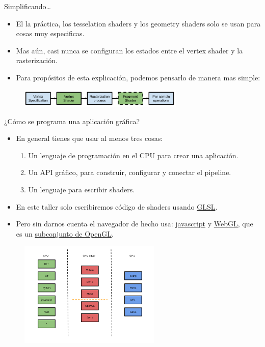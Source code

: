 \begin{frame}{Simplificando\ldots}
\begin{itemize}
    \item El la práctica, los tesselation shaders y los geometry shaders solo se usan para cosas muy especificas.
    \item Mas aún, casi nunca se configuran los estados entre el vertex shader y la rasterización.
    \item Para propósitos de esta explicación, podemos pensarlo de manera mas simple:    
\end{itemize}
\begin{figure}[htb]
  \centering
  \includegraphics[width=0.7\textwidth]{img/SimplifiedPipeline}
\end{figure}
\end{frame}

\begin{frame}[allowframebreaks]{¿Cómo se programa una aplicación gráfica?}
\begin{itemize}
    \item En general tienes que usar al menos tres cosas:
    \begin{enumerate}
        \item Un lenguaje de programación en el CPU para crear una aplicación.
        \item Un API gráfico, para construir, configurar y conectar el pipeline.
        \item Un lenguaje para escribir shaders.
    \end{enumerate}
    \item En este taller solo escribiremos código de shaders usando \href{https://www.khronos.org/opengl/wiki/OpenGL_Shading_Language}{GLSL}.
    \item Pero sin darnos cuenta el navegador de hecho usa: \href{https://en.wikipedia.org/wiki/JavaScript}{javascript} y \href{https://www.khronos.org/webgl/}{WebGL}, que es un \href{https://www.khronos.org/opengles/}{subconjunto de OpenGL}.
\end{itemize}
\begin{figure}[htb]
  \centering
  \includegraphics[width=0.6\textwidth]{img/APIs}
\end{figure}
\end{frame}

